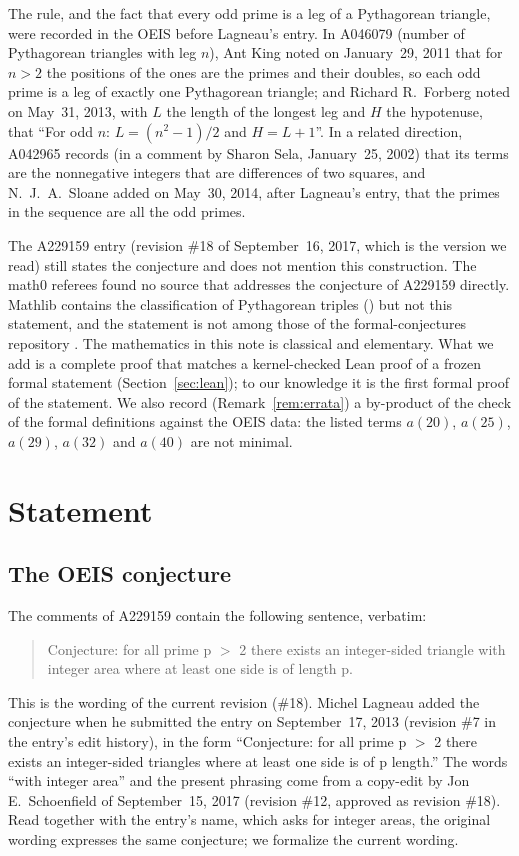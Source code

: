 \documentclass[11pt]{amsart}
\theoremstyle{plain}
\theoremstyle{definition}
\begin{document}
The rule, and the fact that every odd prime is a leg of a Pythagorean triangle, were recorded in the OEIS before Lagneau's entry.
In A046079 \cite{A046079} (number of Pythagorean triangles with leg $n$), Ant King noted on January~29, 2011 that for $n>2$ the positions of the ones are the primes and their doubles, so each odd prime is a leg of exactly one Pythagorean triangle; and Richard R.~Forberg noted on May~31, 2013, with $L$ the length of the longest leg and $H$ the hypotenuse, that ``For odd $n$: $L=(n^2-1)/2$ and $H=L+1$''.
In a related direction, A042965 \cite{A042965} records (in a comment by Sharon Sela, January~25, 2002) that its terms are the nonnegative integers that are differences of two squares, and N.~J.~A.~Sloane added on May~30, 2014, after Lagneau's entry, that the primes in the sequence are all the odd primes.

The A229159 entry (revision \#18 of September~16, 2017, which is the version we read) still states the conjecture and does not mention this construction.
The math0 referees found no source that addresses the conjecture of A229159 directly.
Mathlib \cite{Mathlib} contains the classification of Pythagorean triples () but not this statement, and the statement is not among those of the formal-conjectures repository \cite{FC}.
The mathematics in this note is classical and elementary.
What we add is a complete proof that matches a kernel-checked Lean proof of a frozen formal statement (Section~\ref{sec:lean}); to our knowledge it is the first formal proof of the statement.
We also record (Remark~\ref{rem:errata}) a by-product of the check of the formal definitions against the OEIS data: the listed terms $a(20)$, $a(25)$, $a(29)$, $a(32)$ and $a(40)$ are not minimal.

\section{Statement}\label{sec:statement}

\subsection*{The OEIS conjecture}
The comments of A229159 contain the following sentence, verbatim:
\begin{quote}
Conjecture: for all prime p $>$ 2 there exists an integer-sided triangle with integer area where at least one side is of length p.
\end{quote}
This is the wording of the current revision (\#18).
Michel Lagneau added the conjecture when he submitted the entry on September~17, 2013 (revision \#7 in the entry's edit history), in the form ``Conjecture: for all prime p $>$ 2 there exists an integer-sided triangles where at least one side is of p length.''
The words ``with integer area'' and the present phrasing come from a copy-edit by Jon E.~Schoenfield of September~15, 2017 (revision \#12, approved as revision \#18).
Read together with the entry's name, which asks for integer areas, the original wording expresses the same conjecture; we formalize the current wording.
\end{document}

